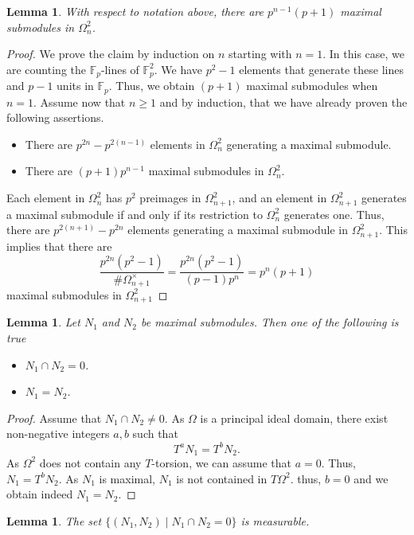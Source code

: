 \documentclass[12pt]{amsart}
\newtheorem{lemma}[theorem]{Lemma}
\numberwithin{equation}{section}
\begin{document}
\begin{lemma}
\label{number of maximal submodules}
    With respect to notation above, there are $p^{n-1}(p+1)$ maximal submodules in $\Omega_n^2$.
\end{lemma}
\begin{proof}
    We prove the claim by induction on $n$ starting with $n=1$. In this case, we are counting the $\mathbb{F}_p$-lines of $\mathbb{F}_p^2$. We  have $p^2-1$ elements that generate these lines and $p-1$ units in $\mathbb{F}_p$. Thus, we obtain $(p+1)$ maximal submodules when $n=1$. Assume now that $n\geq 1$ and by induction, that we have already proven the following assertions.
    \begin{itemize}
        \item There are $p^{2n}-p^{2(n-1)}$ elements in $\Omega_n^2$ generating a maximal submodule. 
        \item There are $(p+1)p^{n-1}$ maximal submodules in $\Omega^2_n$.
    \end{itemize}
    Each element in $\Omega_n^2$ has $p^2$ preimages in $\Omega_{n+1}^2$, and an element in $\Omega_{n+1}^2$ generates a maximal submodule if and only if its restriction to $\Omega_n^2$ generates one. Thus, there are $p^{2(n+1)}-p^{2n}$ elements generating a maximal submodule in $\Omega^2_{n+1}$. This implies that there are
    \[\frac{p^{2n}(p^2-1)}{\#\Omega_{n+1}^\times}=\frac{p^{2n}(p^2-1)}{(p-1)p^{n}}=p^n(p+1)\]
    maximal submodules in $\Omega_{n+1}^2$
\end{proof}
\begin{lemma}
    \label{max-cyclic}
    Let $N_1$ and $N_2$ be maximal submodules. Then one of the following is true
    \begin{itemize}
        \item $N_1\cap N_2=0$.
        \item $N_1=N_2$.
    \end{itemize}
\end{lemma}
\begin{proof}
    Assume that $N_1\cap N_2\neq 0$. As $\Omega$ is a principal ideal domain, there exist non-negative integers $a,b$ such that 
    \[T^aN_1=T^bN_2.\]
    As $\Omega^2$ does not contain any $T$-torsion, we can assume that $a=0$. Thus, $N_1=T^bN_2$. As $N_1$ is maximal, $N_1$ is not contained in $T\Omega^2$. thus, $b=0$ and we obtain indeed $N_1=N_2$. 
\end{proof}
\begin{lemma}
    The set $\{(N_1,N_2)\mid N_1\cap N_2=0\}$ is measurable.
\end{lemma}
\end{document}
